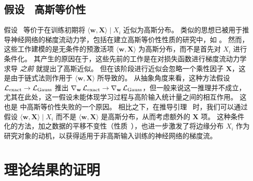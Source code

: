 \subsection{假设~ \vs 高斯等价性}

假设~ 等价于在训练初期将 $\langle \mathbf{w}, \mathbf{X} \rangle \mid X_i$ 近似为高斯分布。
类似的思想已被用于推导神经网络的梯度流动力学，包括在建立高斯等价性性质的研究中，如 \cite{goldt2020modelling,gerace2020generalisation,goldt2022gaussian}。
然而，这些工作建模的是无条件的预激活项 $\langle \mathbf{w}, \mathbf{X} \rangle$ 为高斯分布，而不是首先对 $X_i$ 进行条件化。
其产生的原因在于，这些先前的工作是在对损失函数进行梯度流动力学求导 \emph{之前} 就提出了高斯近似。
但在该阶段进行近似会忽略一个乘性因子 $\mathbf{X}$，这是由于链式法则作用于 $\langle \mathbf{w}, \mathbf{X} \rangle$ 所导致的。
从抽象角度来看，这种方法假设 $\operatorname{\mathcal{L}}_\text{exact} \to \operatorname{\mathcal{L}}_\text{Gauss}$ 推出 $\nabla_\mathbf{w} \operatorname{\mathcal{L}}_\text{exact} \to \nabla_\mathbf{w} \operatorname{\mathcal{L}}_\text{Gauss}$，但一般来说这一推理并不成立，尤其在此处，这一假设未能体现学习过程与高阶输入统计量之间的相互作用。
这也是 \cite{ingrosso2022data} 中高斯等价性失败的一个原因。
相比之下，在推导引理~ 时，我们可以通过假设 $\langle \mathbf{w}, \mathbf{X} \rangle \mid X_i$ 而不是 $\langle \mathbf{w}, \mathbf{X} \rangle$ 是高斯分布，从而考虑额外的 $\mathbf{X}$ 项。
这种条件化的方法，加之数据的平移不变性（性质~），也进一步激发了将边缘分布 $X_i$ 作为研究对象的动机，以获得适用于非高斯输入训练的神经网络的梯度流。
\section{理论结果的证明}
\label{app:proofs}

